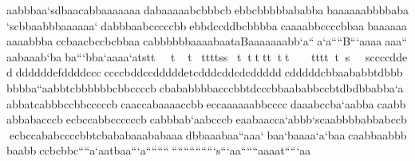 aabbbaa`sdbaacabbaaaaaaadabaaaaabcbbbcbebbcbbbbbababbabaaaaaabbbbaba`scbbaabbbaaaaaa`dabbbaabcccccbbebbdccddbcbbbbacaaaabbccccbbaabaaaaaaaaaabbbaccbaacbccbcbbaacabbbbbbaaaabaataBaaaaaaabb`a``a`a````B```aaaaaaa``aabaaab`baba```bba`aaaa`atsttttttttssttttttttttttssccccddedddddddefddddcccccccbddccdddddetcdddcddcdcdddddcdddddcbbaababbtdbbbbbbba``aabbtcbbbbbbcbbccccbcbababbbbacccbbtdcccbbaababbccbtdbdbbabba`aabbatcabbbccbbcccccbcaaccabaaaaccbbeccaaaaaabbccccdaaabccba`aabbacaabbabbabacccbecbccabbccccccbcabbbab`aabcccbeaabaacca`abbb`scaabbbbabbabccbecbccababccccbbtcbababaaababaaadbbaaabaa``aaa`baa`baaaa`a`baacaabbaabbbbaabbccbcbbc````a`aatbaa```a```````````````````````s```aa``````aaaat`````aa